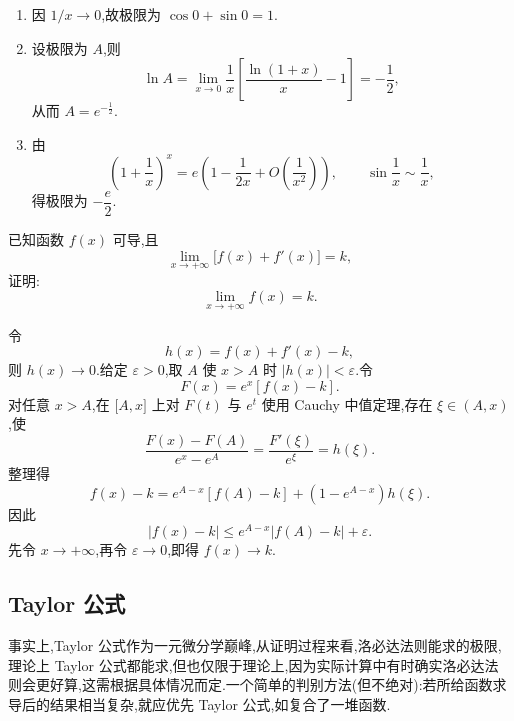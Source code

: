 \begin{solution}
    \begin{enumerate}
        \item 因 $1/x\to0$,故极限为 $\cos0+\sin0=1$.
        \item 设极限为 $A$,则
              \[
                  \ln A
                  =\lim\limits_{x\to0}\dfrac{1}{x}
                  \left[\dfrac{\ln(1+x)}{x}-1\right]
                  =-\dfrac{1}{2},
              \]
              从而 $A=e^{-\frac{1}{2}}$.
        \item 由
              \[
                  \left(1+\dfrac{1}{x}\right)^x
                  =e\left(1-\dfrac{1}{2x}+O\left(\dfrac{1}{x^2}\right)\right),
                  \qquad
                  \sin\dfrac{1}{x}\sim\dfrac{1}{x},
              \]
              得极限为 $-\dfrac{e}{2}$.
    \end{enumerate}
\end{solution}

\begin{example}[\markstar]
    已知函数 $f(x)$ 可导,且
    \[
        \lim\limits_{x\to+\infty}\bigl[f(x)+f'(x)\bigr]=k,
    \]
    证明:
    \[
        \lim\limits_{x\to+\infty}f(x)=k.
    \]
\end{example}
\exampleblank

\begin{solution}
    令
    \[
        h(x)=f(x)+f'(x)-k,
    \]
    则 $h(x)\to0$.给定 $\varepsilon>0$,取 $A$ 使 $x>A$ 时 $|h(x)|<\varepsilon$.令
    \[
        F(x)=e^x[f(x)-k].
    \]
    对任意 $x>A$,在 $\lbrack A,x\rbrack$ 上对 $F(t)$ 与 $e^t$ 使用 Cauchy 中值定理,存在 $\xi\in(A,x)$,使
    \[
        \dfrac{F(x)-F(A)}{e^x-e^A}
        =\dfrac{F'(\xi)}{e^\xi}
        =h(\xi).
    \]
    整理得
    \[
        f(x)-k=e^{A-x}[f(A)-k]+(1-e^{A-x})h(\xi).
    \]
    因此
    \[
        |f(x)-k|\leq e^{A-x}|f(A)-k|+\varepsilon.
    \]
    先令 $x\to+\infty$,再令 $\varepsilon\to0$,即得 $f(x)\to k$.
\end{solution}



\subsection{Taylor 公式}

事实上,Taylor 公式作为一元微分学巅峰,从证明过程来看,洛必达法则能求的极限,理论上 Taylor 公式都能求,但也仅限于理论上,因为实际计算中有时确实洛必达法则会更好算,这需根据具体情况而定.一个简单的判别方法(但不绝对):若所给函数求导后的结果相当复杂,就应优先 Taylor 公式,如复合了一堆函数.

